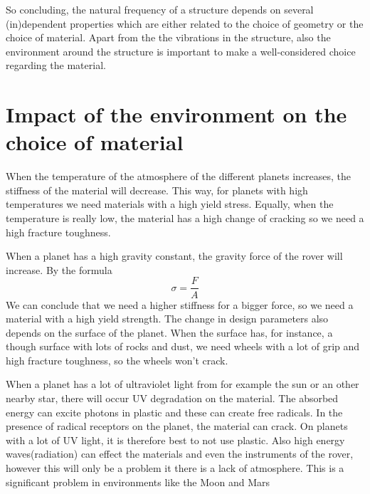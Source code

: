 So concluding, the natural frequency of a structure depends on several (in)dependent properties which are either related to the choice of geometry or the choice of material.
\newline
Apart from the the vibrations in the structure, also the environment around the structure is important to make a well-considered choice regarding the material.
\section{Impact of the environment on the choice of material}
When the temperature of the atmosphere of the different planets increases, the stiffness of the material will decrease. This way, for planets with high temperatures we need materials with a high yield stress. Equally, when the temperature is really low, the material has a high change of cracking so we need a high fracture toughness.

When a planet has a high gravity constant, the gravity force of the rover will increase. By the formula 
\begin{equation} \sigma = \frac{F}{A}
\end{equation}
We can conclude that we need a higher stiffness for a bigger force, so we need a material with a high yield strength.
The change in design parameters also depends on the surface of the planet. When the surface has, for instance, a though surface with lots of rocks and dust, we need wheels with a lot of grip and high fracture toughness, so the wheels won't crack. 

When a planet has a lot of ultraviolet light from for example the sun or an other nearby star, there will occur UV degradation on the material. The absorbed energy can excite photons in plastic and these can create free radicals. In the presence of radical receptors on the planet, the material can crack. On planets with a lot of UV light, it is therefore best to not use plastic. Also high energy waves(radiation) can effect the materials and even the instruments of the rover, however this will only be a problem it there is a lack of atmosphere. This is a significant problem in environments like the Moon and Mars


